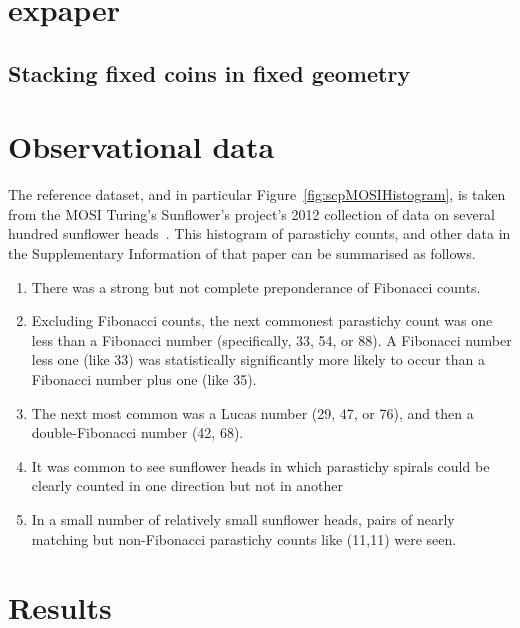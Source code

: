 \section{expaper}

  
 
\subsection{Stacking fixed coins in fixed geometry}


\section{Observational data}
The reference dataset, and in particular Figure~\ref{fig:scpMOSIHistogram},  is taken from the MOSI Turing's Sunflower's project's 2012 collection of data on several hundred sunflower heads~\cite{swintonNovelFibonacciNonFibonacci2016}.    This histogram of parastichy counts, and other data in the Supplementary Information of that paper can be summarised as follows.
\begin{enumerate}
	\item There was a strong but not complete preponderance of Fibonacci counts.
	\item	Excluding Fibonacci counts, the next commonest parastichy count was one less than a Fibonacci number (specifically, 33, 54, or 88).  A Fibonacci number less one (like 33) was statistically significantly more likely to occur than a Fibonacci number plus one (like 35).
	\item The next most common was a Lucas number (29, 47, or 76), and then a double-Fibonacci number (42, 68).
	\item It was common to see sunflower heads in which parastichy spirals could be clearly counted in one direction but not in another
	\item In a small number of relatively small sunflower heads, pairs of nearly matching but non-Fibonacci parastichy counts like (11,11)  were seen.
\end{enumerate}



\section{Results}

